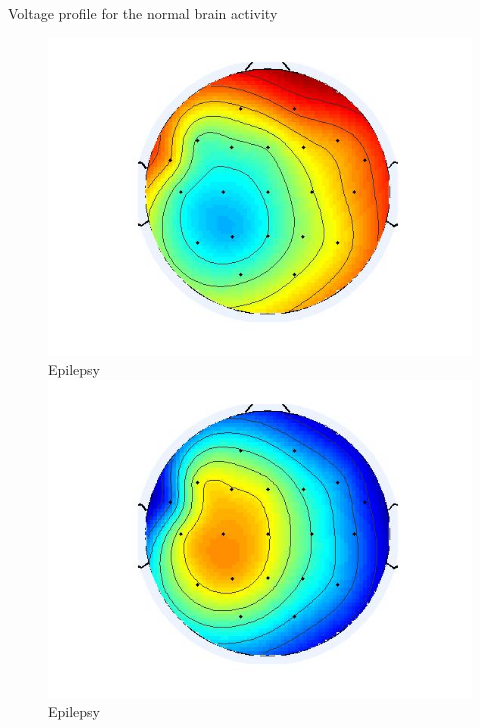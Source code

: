 \documentclass[t,12pt,english
\ifx\beamermode\undefined\else,\beamermode\fi
]{beamer}
\begin{document}
\begin{frame}{Voltage profile for the normal brain activity }
\begin{figure}[!htbp]
\includegraphics[width=1\textwidth]{22.jpg}\\
\tiny{Epilepsy}\label{a22}
\endminipage\hfill
{}%
\centering
\includegraphics[width=1\textwidth]{23.jpg}\\
\tiny{Epilepsy}\label{a23}
\endminipage\hfill
\end{figure}

\end{frame}
\end{document}
